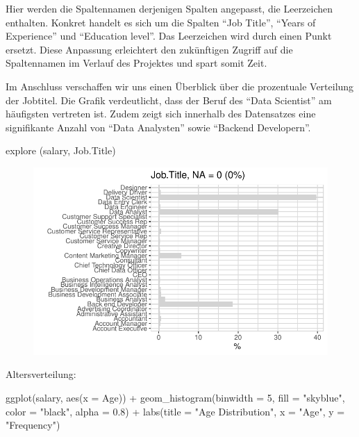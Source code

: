 \documentclass[
  letterpaper,
  DIV=11,
  numbers=noendperiod]{scrartcl}
\newenvironment{Shaded}{\begin{snugshade}}{\end{snugshade}}
\newcommand{\AttributeTok}[1]{\textcolor[rgb]{0.40,0.45,0.13}{#1}}
\newcommand{\DecValTok}[1]{\textcolor[rgb]{0.68,0.00,0.00}{#1}}
\newcommand{\FloatTok}[1]{\textcolor[rgb]{0.68,0.00,0.00}{#1}}
\newcommand{\FunctionTok}[1]{\textcolor[rgb]{0.28,0.35,0.67}{#1}}
\newcommand{\NormalTok}[1]{\textcolor[rgb]{0.00,0.23,0.31}{#1}}
\newcommand{\SpecialCharTok}[1]{\textcolor[rgb]{0.37,0.37,0.37}{#1}}
\newcommand{\StringTok}[1]{\textcolor[rgb]{0.13,0.47,0.30}{#1}}
\begin{document}
Hier werden die Spaltennamen derjenigen Spalten angepasst, die
Leerzeichen enthalten. Konkret handelt es sich um die Spalten ``Job
Title'', ``Years of Experience'' und ``Education level''. Das
Leerzeichen wird durch einen Punkt ersetzt. Diese Anpassung erleichtert
den zukünftigen Zugriff auf die Spaltennamen im Verlauf des Projektes
und spart somit Zeit.

Im Anschluss verschaffen wir uns einen Überblick über die prozentuale
Verteilung der Jobtitel. Die Grafik verdeutlicht, dass der Beruf des
``Data Scientist'' am häufigsten vertreten ist. Zudem zeigt sich
innerhalb des Datensatzes eine signifikante Anzahl von ``Data
Analysten'' sowie ``Backend Developern''.

\begin{Shaded}
\begin{Highlighting}[]
\FunctionTok{explore}\NormalTok{ (salary, Job.Title)}
\end{Highlighting}
\end{Shaded}

\begin{figure}[H]

{\centering \includegraphics{main_doc_files/figure-pdf/unnamed-chunk-7-1.pdf}

}

\end{figure}

Altersverteilung:

\begin{Shaded}
\begin{Highlighting}[]
\FunctionTok{ggplot}\NormalTok{(salary, }\FunctionTok{aes}\NormalTok{(}\AttributeTok{x =}\NormalTok{ Age)) }\SpecialCharTok{+}
  \FunctionTok{geom\_histogram}\NormalTok{(}\AttributeTok{binwidth =} \DecValTok{5}\NormalTok{, }\AttributeTok{fill =} \StringTok{"skyblue"}\NormalTok{, }\AttributeTok{color =} \StringTok{"black"}\NormalTok{, }\AttributeTok{alpha =} \FloatTok{0.8}\NormalTok{) }\SpecialCharTok{+}
  \FunctionTok{labs}\NormalTok{(}\AttributeTok{title =} \StringTok{"Age Distribution"}\NormalTok{,}
       \AttributeTok{x =} \StringTok{"Age"}\NormalTok{,}
       \AttributeTok{y =} \StringTok{"Frequency"}\NormalTok{)}
\end{Highlighting}
\end{Shaded}
\end{document}
